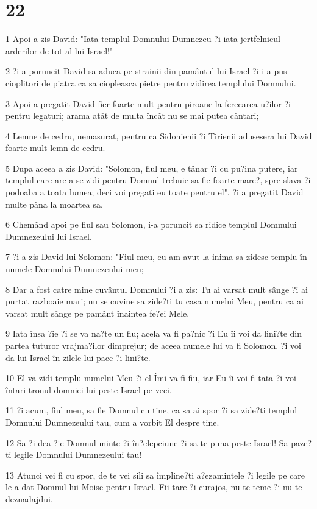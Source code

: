 \chapter{22}

\par 1 Apoi a zis David: "Iata templul Domnului Dumnezeu ?i iata jertfelnicul arderilor de tot al lui Israel!"
\par 2 ?i a poruncit David sa aduca pe strainii din pamântul lui Israel ?i i-a pus cioplitori de piatra ca sa ciopleasca pietre pentru zidirea templului Domnului.
\par 3 Apoi a pregatit David fier foarte mult pentru piroane la ferecarea u?ilor ?i pentru legaturi; arama atât de multa încât nu se mai putea cântari;
\par 4 Lemne de cedru, nemasurat, pentru ca Sidonienii ?i Tirienii adusesera lui David foarte mult lemn de cedru.
\par 5 Dupa aceea a zis David: "Solomon, fiul meu, e tânar ?i cu pu?ina putere, iar templul care are a se zidi pentru Domnul trebuie sa fie foarte mare?, spre slava ?i podoaba a toata lumea; deci voi pregati eu toate pentru el". ?i a pregatit David multe pâna la moartea sa.
\par 6 Chemând apoi pe fiul sau Solomon, i-a poruncit sa ridice templul Domnului Dumnezeului lui Israel.
\par 7 ?i a zis David lui Solomon: "Fiul meu, eu am avut la inima sa zidesc templu în numele Domnului Dumnezeului meu;
\par 8 Dar a fost catre mine cuvântul Domnului ?i a zis: Tu ai varsat mult sânge ?i ai purtat razboaie mari; nu se cuvine sa zide?ti tu casa numelui Meu, pentru ca ai varsat mult sânge pe pamânt înaintea fe?ei Mele.
\par 9 Iata însa ?ie ?i se va na?te un fiu; acela va fi pa?nic ?i Eu îi voi da lini?te din partea tuturor vrajma?ilor dimprejur; de aceea numele lui va fi Solomon. ?i voi da lui Israel în zilele lui pace ?i lini?te.
\par 10 El va zidi templu numelui Meu ?i el Îmi va fi fiu, iar Eu îi voi fi tata ?i voi întari tronul domniei lui peste Israel pe veci.
\par 11 ?i acum, fiul meu, sa fie Domnul cu tine, ca sa ai spor ?i sa zide?ti templul Domnului Dumnezeului tau, cum a vorbit El despre tine.
\par 12 Sa-?i dea ?ie Domnul minte ?i în?elepciune ?i sa te puna peste Israel! Sa paze?ti legile Domnului Dumnezeului tau!
\par 13 Atunci vei fi cu spor, de te vei sili sa împline?ti a?ezamintele ?i legile pe care le-a dat Domnul lui Moise pentru Israel. Fii tare ?i curajos, nu te teme ?i nu te deznadajdui.
